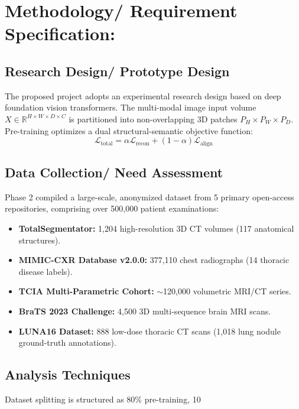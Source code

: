 \documentclass[11pt,a4paper]{article}
\begin{document}
\section{Methodology/ Requirement Specification:}

\subsection{Research Design/ Prototype Design}
The proposed project adopts an experimental research design based on deep foundation vision transformers. The multi-modal image input volume $X \in \mathbb{R}^{H \times W \times D \times C}$ is partitioned into non-overlapping 3D patches $P_H \times P_W \times P_D$. Pre-training optimizes a dual structural-semantic objective function:
\begin{equation}
    \mathcal{L}_{\text{total}} = \alpha \mathcal{L}_{\text{recon}} + (1 - \alpha) \mathcal{L}_{\text{align}}
\end{equation}

\subsection{Data Collection/ Need Assessment}
Phase 2 compiled a large-scale, anonymized dataset from 5 primary open-access repositories, comprising over 500,000 patient examinations:
\begin{itemize}
    \item \textbf{TotalSegmentator:} 1,204 high-resolution 3D CT volumes (117 anatomical structures).
    \item \textbf{MIMIC-CXR Database v2.0.0:} 377,110 chest radiographs (14 thoracic disease labels).
    \item \textbf{TCIA Multi-Parametric Cohort:} $\sim$120,000 volumetric MRI/CT series.
    \item \textbf{BraTS 2023 Challenge:} 4,500 3D multi-sequence brain MRI scans.
    \item \textbf{LUNA16 Dataset:} 888 low-dose thoracic CT scans (1,018 lung nodule ground-truth annotations).
\end{itemize}

\subsection{Analysis Techniques}
Dataset splitting is structured as 80\% pre-training, 10%
\end{document}
